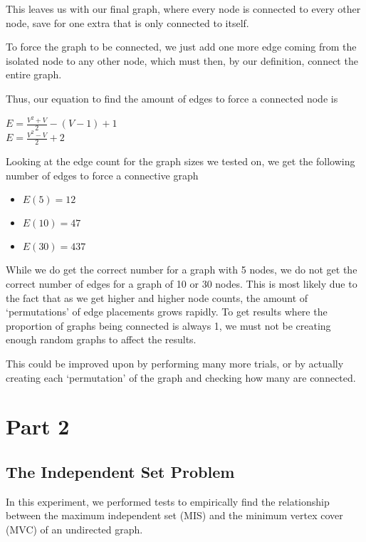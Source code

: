 \documentclass[12pt]{article}
\begin{document}
This leaves us with our final graph, where every node is connected to every other node, save for one extra that is only connected to itself.

To force the graph to be connected, we just add one more edge coming from the isolated node to any other node, which must then, by our definition, connect the entire graph.

Thus, our equation to find the amount of edges to force a connected node is
\begin{center}
    $E = \frac{V^2 + V}{2} - (V-1) + 1$\\
    $E = \frac{V^2 - V}{2} + 2$
\end{center}

Looking at the edge count for the graph sizes we tested on, we get the following number of edges to force a connective graph

\begin{itemize}
    \item $E(5) = 12$ 
    \item $E(10) = 47$ 
    \item $E(30) = 437$ 
\end{itemize}

While we do get the correct number for a graph with 5 nodes, we do not get the correct number of edges for a graph of 10 or 30 nodes. This is most likely due to the fact that as we get higher and higher node counts, the
amount of `permutations' of edge placements grows rapidly. To get results where the proportion of graphs being connected is always 1, we must not be creating enough random graphs to affect the results.

This could be improved upon by performing many more trials, or by actually creating each `permutation' of the graph and checking how many are connected.

%
%
%
%
\newpage
\section{Part 2}
\subsection{The Independent Set Problem}
In this experiment, we performed tests to empirically find the relationship between the maximum 
independent set (MIS) and the minimum vertex cover (MVC) of an undirected graph.
\end{document}

